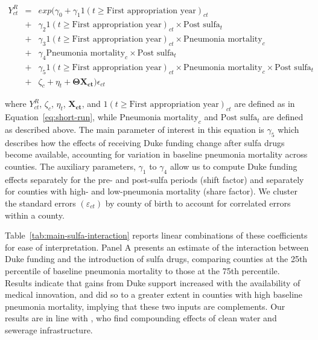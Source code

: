 \documentclass[12pt]{article}
\begin{document}
\begin{singlespace}
\begin{small}
\vspace{-0.5cm}
\begin{eqnarray}
    Y^{R}_{ct}
    &=& exp(\gamma_0 + \gamma_1{1(t \geq \text{First appropriation year})_{ct}} \nonumber \\
    &+& \gamma_2{1(t \geq \text{First appropriation year})_{ct}} \times \text{Post sulfa}_{t} \nonumber \\
    &+& \gamma_3{1(t \geq \text{First appropriation year})_{ct}} \times \text{Pneumonia mortality}_{c} \nonumber \\
    &+& \gamma_4{\text{Pneumonia mortality}_{c} \times \text{Post sulfa}_{t}} \nonumber \\
    &+& \gamma_5{1(t \geq \text{First appropriation year})_{ct}} \times \text{Pneumonia mortality}_{c} \times \text{Post sulfa}_{t} \nonumber \\
    &+& \zeta_c + \eta_t + \boldsymbol{\Theta} \mathbf{X_{ct}})\epsilon_{ct} \label{eq:sulfa-interaction}
\end{eqnarray}
\end{small}
\end{singlespace}

\noindent where $Y^{R}_{ct}$, $\zeta_c$, $\eta_t$, $\mathbf{X_{ct}}$, and $1(t \geq \text{First appropriation year})_{ct}$ are defined as in Equation~\ref{eq:short-run}, while $\text{Pneumonia mortality}_{c}$ and $\text{Post sulfa}_{t}$ are defined as described above. 
The main parameter of interest in this equation is $\gamma_5$ which describes how the effects of receiving Duke funding change after sulfa drugs become available, accounting for variation in baseline pneumonia mortality across counties. 
The auxiliary parameters, $\gamma_1$ to $\gamma_4$ allow us to compute Duke funding effects separately for the pre- and post-sulfa periods (shift factor) and separately for counties with high- and low-pneumonia mortality (share factor).
We cluster the standard errors $(\varepsilon_{ct})$ by county of birth to account for correlated errors within a county.

Table~\ref{tab:main-sulfa-interaction} reports linear combinations of these coefficients for ease of interpretation. 
Panel A presents an estimate of the interaction between Duke funding and the introduction of sulfa drugs, comparing counties at the 25th percentile of baseline pneumonia mortality to those at the 75th percentile. Results indicate that gains from Duke support increased with the availability of medical innovation, and did so to a greater extent in counties with high baseline pneumonia mortality, implying that these two inputs are complements.
Our results are in line with , who find compounding effects of clean water and sewerage infrastructure.
\end{document}
